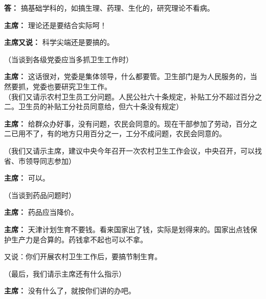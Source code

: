 \begin{list}{}
\item[\textbf{答：}] 搞基础学科的，如搞生理、药理、生化的，研究理论不看病。

\item[\textbf{主席：}] 理论还是要结合实际呵！

\item[\textbf{主席又说：}] 科学尖端还是要搞的。

（当谈到各级党委应当多抓卫生工作时）

\item[\textbf{主席：}] 这话很对，党委是集体领导，什么都要管。卫生部门是为人民服务的，当然要抓，党委也要研究卫生工作。\\
（我们又请示农村卫生员工分问题。人民公社六十条规定，补贴工分不超过百分之二。卫生员的补贴工分社员同意给，但六十条没有规定）

\item[\textbf{主席：}] 给群众办好事，没有问题，农民会同意的。现在干部参加了劳动，百分之二已用不了，有的地方只用百分之一，工分不成问题，农民会同意的。

（我们又请示主席，建议中央今年召开一次农村卫生工作会议，中央召开，可以找省、市领导同志参加）

\item[\textbf{主席：}] 可以。

（当谈到药品问题时）

\item[\textbf{主席：}] 药品应当降价。

\item[\textbf{主席：}] 天津计划生育不要钱。看来国家出了钱，实际是划得来的。国家出点钱保护生产力是合算的。药钱拿不起也可以不拿。

又说：你们开展农村卫生工作后，要搞节制生育。

（最后，我们请示主席还有什么指示）

\item[\textbf{主席：}] 没有什么了，就按你们讲的办吧。
\end{list}
